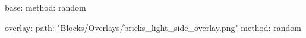 base:
  method: random
  
overlay:
  path: "Blocks/Overlays/bricks_light_side_overlay.png"
  method: random
